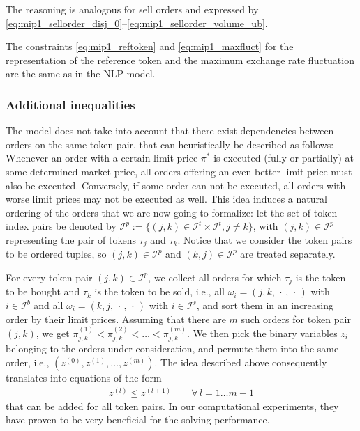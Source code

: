 \documentclass[11pt,parskip=full]{scrartcl}%
\newcommand*{\ie}{i.e., }
\newcommand*{\itokens}{\mathcal{I}^t}       %
\newcommand*{\itokenpairs}{\mathcal{I}^p}   %
\newcommand*{\ibuyorders}{\mathcal{I}^b}    %
\newcommand*{\isellorders}{\mathcal{I}^s}   %
\begin{document}
The reasoning is analogous for sell orders and expressed by
\eqref{eq:mip1_sellorder_disj_0}--\eqref{eq:mip1_sellorder_volume_ub}.

The constraints \eqref{eq:mip1_reftoken} and \eqref{eq:mip1_maxfluct} for the representation of the
reference token and the maximum exchange rate fluctuation are the same as in the NLP model.


\subsubsection*{Additional inequalities}

The model does not take into account that there exist dependencies between orders on the same token
pair, that can heuristically be described as follows:
Whenever an order with a certain limit price $ \pi^* $ is executed (fully or partially) at some
determined market price, all orders offering an even better limit price must also be executed.
Conversely, if some order can not be executed, all orders with worse limit prices may not be
executed as well.
This idea induces a natural ordering of the orders that we are now going to formalize:
let the set of token index pairs be denoted by $ \itokenpairs := \{(j,k) \in \itokens \times
\itokens, j \neq k\} $, with $ (j,k) \in \itokenpairs $ representing the pair of tokens $ \tau_j $
and $ \tau_k $.
Notice that we consider the token pairs to be ordered tuples, so $ (j,k) \in \itokenpairs $ and
$ (k,j) \in \itokenpairs $ are treated separately.

For every token pair $ (j,k) \in \itokenpairs $, we collect all orders for which $ \tau_j $ is the
token to be bought and $ \tau_k $ is the token to be sold, \ie all
$ \omega_i = (j, k,\, \cdot \,,\, \cdot \,) $ with $ i \in \ibuyorders $ and all
$ \omega_i = (k, j,\, \cdot \,,\, \cdot \,) $ with $ i \in \isellorders $,
and sort them in an increasing order by their limit prices.
Assuming that there are $ m $ such orders for token pair $ (j,k) $, we get
$ \pi^{(1)}_{j,k} < \pi^{(2)}_{j,k} < \ldots < \pi^{(m)}_{j,k} $.
We then pick the binary variables $ z_i $ belonging to the orders under consideration, and permute
them into the same order, \ie $ (z^{(0)}, z^{(1)}, \ldots, z^{(m)}) $.
The idea described above consequently translates into equations of the form
\begin{align}
  z^{(l)} \le z^{(l+1)} \qquad \forall \, l = 1 \ldots m\!-\!1
  \label{eq:mip1_order_precedence}
\end{align}
that can be added for all token pairs.
In our computational experiments, they have proven to be very beneficial for the solving
performance.
\end{document}
